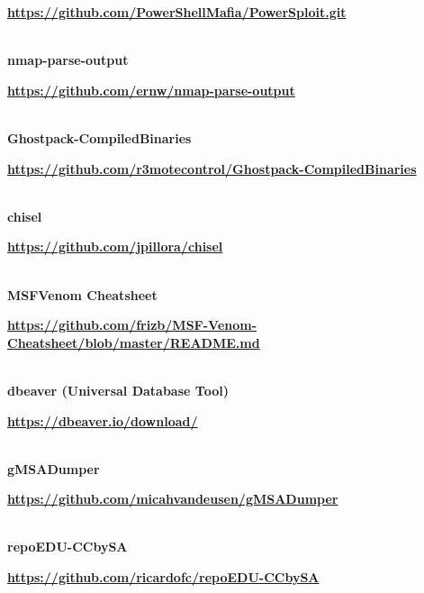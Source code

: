 \begin{adjustbox}{width=0.94\paperwidth,center}
\begin{tcolorbox}[colback=blue!5!white,colframe=blue!50!black,
  colbacktitle=blue!75!black,title=Ligazóns,fonttitle=\bfseries\color{white}]
    \par 
      \href{https://github.com/PowerShellMafia/PowerSploit.git}{\textbf{\color{blue}https://github.com/PowerShellMafia/PowerSploit.git}}
    
  
\vspace*{-0.2cm} \DrawLine\\ \textbf{nmap-parse-output}

    \par 
      \href{https://github.com/ernw/nmap-parse-output}{\textbf{\color{blue}https://github.com/ernw/nmap-parse-output}}
    
  
\vspace*{-0.2cm} \DrawLine\\ \textbf{Ghostpack-CompiledBinaries}

    \par 
      \href{https://github.com/r3motecontrol/Ghostpack-CompiledBinaries}{\textbf{\color{blue}https://github.com/r3motecontrol/Ghostpack-CompiledBinaries}}
    
  
\vspace*{-0.2cm} \DrawLine\\ \textbf{chisel}

    \par 
      \href{https://github.com/jpillora/chisel}{\textbf{\color{blue}https://github.com/jpillora/chisel}}
    
  
\vspace*{-0.2cm} \DrawLine\\ \textbf{MSFVenom Cheatsheet}

    \par 
      \href{https://github.com/frizb/MSF-Venom-Cheatsheet/blob/master/README.md}{\textbf{\color{blue}https://github.com/frizb/MSF-Venom-Cheatsheet/blob/master/README.md}}
    
  
\vspace*{-0.2cm} \DrawLine\\ \textbf{dbeaver (Universal Database Tool)}

    \par 
      \href{https://dbeaver.io/download/}{\textbf{\color{blue}https://dbeaver.io/download/}}
    
\vspace*{-0.2cm} \DrawLine\\ \textbf{gMSADumper}

    \par 
      \href{https://github.com/micahvandeusen/gMSADumper}{\textbf{\color{blue}https://github.com/micahvandeusen/gMSADumper}}

\vspace*{-0.2cm} \DrawLine\\ \textbf{repoEDU-CCbySA}

    \par 
      \href{https://github.com/ricardofc/repoEDU-CCbySA}{\textbf{\color{blue}https://github.com/ricardofc/repoEDU-CCbySA}}

\vspace*{-0.2cm}
\end{tcolorbox}
\end{adjustbox}
\vspace*{-2cm}
